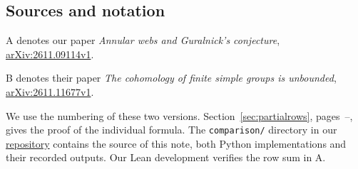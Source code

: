 \documentclass[10pt,a4paper]{article}
\begin{document}
\subsection{Sources and notation}
A denotes our paper \emph{Annular webs and Guralnick's conjecture}, \href{https://arxiv.org/abs/2611.09114v1}{arXiv:2611.09114v1}.

B denotes their paper \emph{The cohomology of finite simple groups is unbounded}, \href{https://arxiv.org/abs/2611.11677v1}{arXiv:2611.11677v1}.

We use the numbering of these two versions. Section~\ref{sec:partialrows}, pages~\pageref{sec:partialrows}--\pageref{partial:end}, gives the proof of the individual formula. The \texttt{comparison/} directory in our \href{https://github.com/dtubbenhauer/mutwo}{repository} contains the source of this note, both Python implementations and their recorded outputs. Our Lean development verifies the row sum in A.


\newpage






\end{document}
